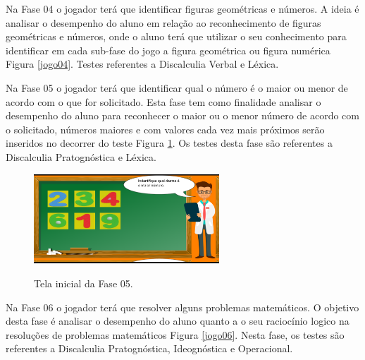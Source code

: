 \documentclass[
	12pt,				%
    oneside,			%
	a4paper,			%
	english,			%
	french,				%
	spanish,			%
	brazil,				%
	]{abntex2}
\begin{document}
Na Fase 04 o jogador terá que identificar figuras geométricas e números. A ideia é analisar o desempenho do aluno em relação ao reconhecimento de figuras geométricas e números, onde o aluno terá que utilizar o seu conhecimento para identificar em cada sub-fase do jogo a figura geométrica ou figura numérica Figura \ref{jogo04}. Testes referentes a Discalculia Verbal e Léxica.



Na Fase 05 o jogador terá que identificar qual o número é o maior ou menor de acordo com o que for solicitado. Esta fase tem como  finalidade analisar o desempenho do aluno para reconhecer o maior ou o menor número de acordo com o solicitado, números maiores e com valores cada vez mais próximos serão inseridos no decorrer do teste Figura \ref{jogo05}. Os testes desta fase são referentes a Discalculia Pratognóstica e Léxica.


\begin{figure} [h] 


\caption{Tela inicial da Fase 05.}

\includegraphics[width=0.62\textwidth]{jogo05.png} %
\centering
\\
\label{jogo05} 
\end{figure}

Na Fase 06 o jogador terá que resolver alguns problemas matemáticos. O objetivo desta fase é analisar o desempenho do aluno quanto a o seu raciocínio logico na resoluções de problemas matemáticos Figura \ref{jogo06}. Nesta fase, os testes são referentes a Discalculia Pratognóstica, Ideognóstica e Operacional.
\end{document}
